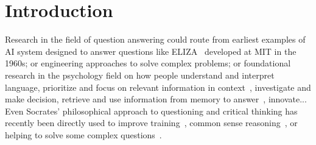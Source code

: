 \documentclass[acmsmall]{acmart}
\begin{document}



\maketitle

\pagebreak
\small

\section{Introduction}
Research in the field of question answering could route from earliest examples of AI system designed to answer questions like ELIZA~\citep{weizenbaumELIZAComputerProgram1966} developed at MIT in the 1960s; or engineering approaches to solve complex problems; or foundational research in the psychology field on how people understand and interpret language, prioritize and focus on relevant information in context~\citep{cuadraOPENINGBLACKBOX1967, wilsonSituationalRelevance1973}, investigate and make decision, retrieve and use information from memory to answer~\citep{normanMemoryKnowledgeAnswering1972}, innovate... Even Socrates' philosophical approach to questioning and critical thinking has recently been directly used to improve training~\citep{pagnoniSocraticPretrainingQuestionDriven2022}, common sense reasoning~\citep{jungMaieuticPromptingLogically2022}, or helping to solve some complex questions~\citep{shridharAutomaticGenerationSocratic2022}.
\end{document}

